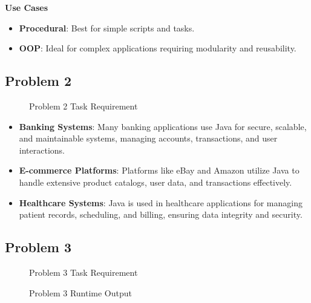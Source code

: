 \documentclass{article}
\begin{document}
\textbf{Use Cases}
\begin{itemize}
    \item \textbf{Procedural}: Best for simple scripts and tasks.
    \item \textbf{OOP}: Ideal for complex applications requiring modularity and reusability.
\end{itemize}

\subsection*{Problem 2}

\begin{figure}[H]
    \centering
    \caption{Problem 2 Task Requirement}
\end{figure}

\begin{itemize}
    \item \textbf{Banking Systems}: Many banking applications use Java for secure, scalable, and maintainable systems, managing accounts, transactions, and user interactions.
    \item \textbf{E-commerce Platforms}: Platforms like eBay and Amazon utilize Java to handle extensive product catalogs, user data, and transactions effectively.
    \item \textbf{Healthcare Systems}: Java is used in healthcare applications for managing patient records, scheduling, and billing, ensuring data integrity and security.
\end{itemize}

\subsection*{Problem 3}

\begin{figure}[H]
    \centering
    \caption{Problem 3 Task Requirement}
\end{figure}

\begin{figure}[H]
    \centering
    \caption{Problem 3 Runtime Output}
\end{figure}
\end{document}
